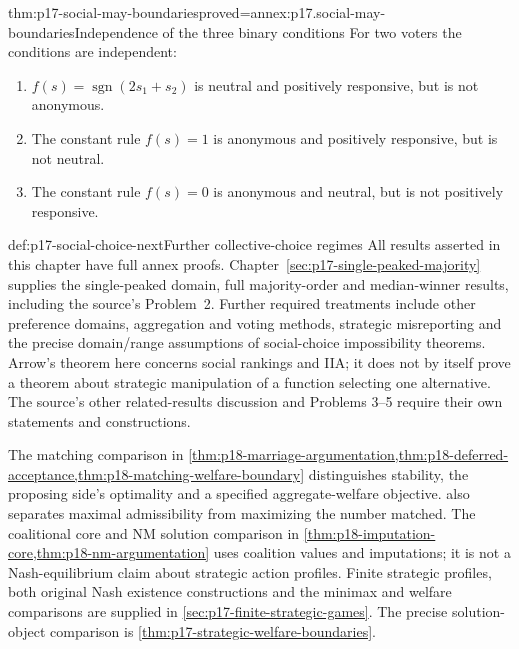 \begin{hbtheorem}{thm:p17-social-may-boundaries}{proved=annex:p17.social-may-boundaries}{Independence of the three binary conditions}
For two voters the conditions are independent:
\begin{enumerate}
\item \(f(s)=\operatorname{sgn}(2s_1+s_2)\) is neutral and positively
      responsive, but is not anonymous.
\item The constant rule \(f(s)=1\) is anonymous and positively responsive,
      but is not neutral.
\item The constant rule \(f(s)=0\) is anonymous and neutral, but is not
      positively responsive.
\end{enumerate}
\end{hbtheorem}

\begin{proofboundary}{def:p17-social-choice-next}{Further collective-choice regimes}
All results asserted in this chapter have full annex proofs.
Chapter~\ref{sec:p17-single-peaked-majority} supplies the single-peaked
domain, full majority-order and median-winner results, including the
source's Problem~2. Further required treatments include other preference
domains, aggregation and voting methods, strategic misreporting and
the precise domain/range assumptions of social-choice impossibility
theorems. Arrow's theorem here concerns social rankings and IIA; it does
not by itself prove a theorem about strategic manipulation of a function
selecting one alternative. The source's other related-results discussion
and Problems 3--5 require their own statements and constructions.

The matching comparison in \cref{thm:p18-marriage-argumentation,thm:p18-deferred-acceptance,thm:p18-matching-welfare-boundary}
distinguishes stability, the proposing side's optimality and a specified
aggregate-welfare objective.  also
separates maximal admissibility from maximizing the number matched.
The coalitional core and NM solution comparison in
\cref{thm:p18-imputation-core,thm:p18-nm-argumentation}
uses coalition values and imputations; it is not a Nash-equilibrium
claim about strategic action profiles.
Finite strategic profiles, both original Nash existence constructions
and the minimax and welfare comparisons are supplied in
\cref{sec:p17-finite-strategic-games}. The precise solution-object
comparison is \cref{thm:p17-strategic-welfare-boundaries}.
\end{proofboundary}
